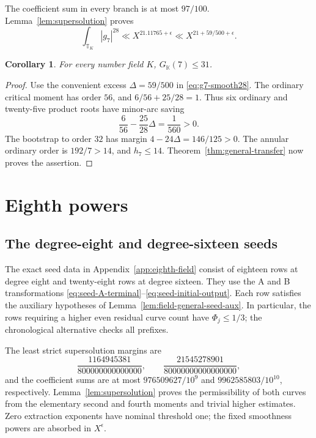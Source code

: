 \documentclass[11pt]{amsart}
\newtheorem{corollary}[theorem]{Corollary}
\theoremstyle{definition}
\numberwithin{equation}{section}
\begin{document}
The coefficient sum in every branch is at most $97/100$.
Lemma~\ref{lem:supersolution} proves
\begin{equation}\label{eq:g7-smooth28}
 \int_{\mathbb T_K}|g_7|^{28}\ll X^{21.11765+\epsilon}
              \ll X^{21+59/500+\epsilon}.
\end{equation}

\begin{corollary}\label{thm:seventh-transfer}
For every number field $K$, $G_{\mathbb K}(7)\le31$.
\end{corollary}
\begin{proof}
Use the convenient excess $\Delta=59/500$ in \eqref{eq:g7-smooth28}.
The ordinary critical moment has order $56$, and
$6/56+25/28=1$. Thus six ordinary and twenty-five product roots
have minor-arc saving
\[
 \frac6{56}-\frac{25}{28}\Delta=\frac1{560}>0.
\]
The bootstrap to order $32$ has margin
$4-24\Delta=146/125>0$.
The annular ordinary order is $192/7>14$, and $h_7\le14$.
Theorem~\ref{thm:general-transfer} now proves the assertion.
\end{proof}

\section{Eighth powers}
\label{sec:eighth-powers}
\subsection{The degree-eight and degree-sixteen seeds}
\label{sec:field-seed-moments}
The exact seed data in Appendix~\ref{app:eighth-field} consist of
eighteen rows at degree eight and twenty-eight rows at degree sixteen.
They use the A and B transformations
\eqref{eq:seed-A-terminal}--\eqref{eq:seed-initial-output}.
Each row satisfies the auxiliary hypotheses of
Lemma~\ref{lem:field-general-seed-aux}. In particular, the rows
requiring a higher even residual curve count have $\Phi_j\le1/3$;
the chronological alternative checks all prefixes.

The least strict supersolution margins are
\[
 \frac{1164945381}{800000000000000},\qquad
 \frac{21545278901}{80000000000000000},
\]
and the coefficient sums are at most
$976509627/10^9$ and $9962585803/10^{10}$, respectively.
Lemma~\ref{lem:supersolution} proves the permissibility of both
curves from the elementary second and fourth moments and trivial
higher estimates. Zero extraction exponents have nominal threshold
one; the fixed smoothness powers are absorbed in $X^\epsilon$.
\end{document}
